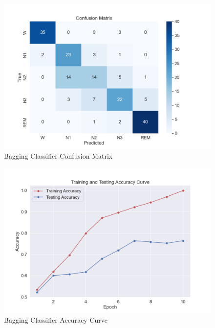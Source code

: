 \begin{figure}[H]
	\centering
	\includegraphics[width=\textwidth]{img/paper_1/BG_confusion_matrix.png}
	\caption{Bagging Classifier Confusion Matrix}
\end{figure}

\begin{figure}[H]
	\centering
	\includegraphics[width=\textwidth]{img/paper_1/accuracy_curve.png}
	\caption{Bagging Classifier Accuracy Curve}
\end{figure}

